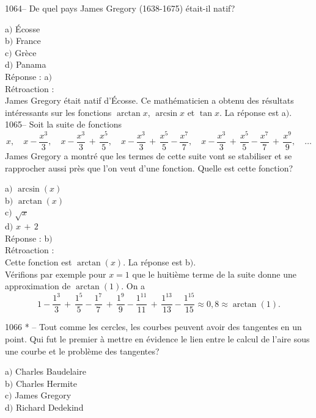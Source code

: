 ﻿\documentclass[letterpaper, 12pt]{article}
\begin{document}
1064-- De quel pays James Gregory (1638-1675) \'etait-il natif?

a$)$ \'Ecosse \\
b$)$ France  \\
c$)$ Gr\`ece  \\
d$)$ Panama \\

R\'eponse : a$)$ \\

R\'etroaction : \\
James Gregory \'etait natif d'\'Ecosse. Ce math\'ematicien a obtenu
des r\'esultats int\'eressants sur les fonctions $\arctan x$,
$\arcsin x$ et $\tan x$.
La r\'eponse est a$)$.\\

1065-- Soit la suite de fonctions
$$\displaystyle{x,\quad x-\frac{x^3}3,\quad
x-\frac{x^3}3\,+\,\frac{x^5}5,\quad
x-\frac{x^3}3\,+\,\frac{x^5}5-\frac{x^7}7,\quad
x-\frac{x^3}3\,+\,\frac{x^5}5-\frac{x^7}7\,+\,\frac{x^9}9,\quad\ldots}$$
James Gregory a montr\'e que les termes de cette suite vont se
stabiliser et se rapprocher aussi pr\`es que l'on veut d'une
fonction. Quelle est cette fonction?

a$)$ $\arcsin(x)$ \\
b$)$ $\arctan(x)$  \\
c$)$ $\sqrt x$  \\
d$)$ $x\,+\,2$\\

R\'eponse : b$)$\\

R\'etroaction : \\
Cette fonction est $\arctan(x)$. La r\'eponse est b$)$.\\
V\'erifions par exemple pour $x=1$ que le huiti\`eme terme de la
suite donne une approximation de $\arctan(1)$. On a
$$1-\frac{1^3}3\,+\,\frac{1^5}5-\frac{1^7}7\,+\,\frac{1^9}9-\frac{1^{11}}{11}\,+\,\frac{1^{13}}{13}-\frac{1^{15}}{15}\approx0,8\approx\arctan(1).$$


1066 * -- Tout comme les cercles, les courbes peuvent avoir des
tangentes en un point. Qui fut le premier \`a mettre en \'evidence
le lien entre le calcul de l'aire sous une courbe et le probl\`eme
des tangentes?

a$)$ Charles Baudelaire \\
b$)$ Charles Hermite \\
c$)$ James Gregory  \\
d$)$ Richard Dedekind \\
\end{document}
